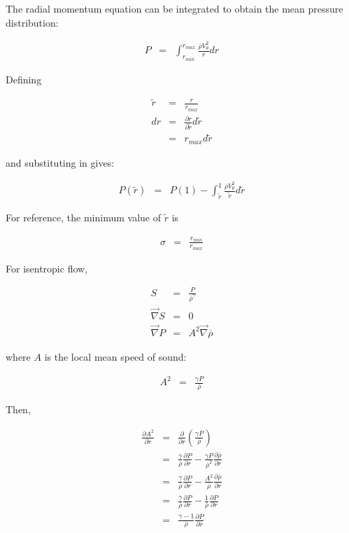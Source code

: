 \documentclass[12pt]{article}
\begin{document}
The radial momentum equation can be integrated to obtain the
mean pressure distribution:

\begin{eqnarray}
P &=& \int_{r_{min}}^{r_{max}} \frac{\overline{\rho} V_{\theta}^2}{r} dr
\nonumber
\end{eqnarray}

Defining

\begin{eqnarray}
\widetilde{r} &=& \frac{r}{r_{max}}
\nonumber
\\
dr &=& \frac{\partial r}{\partial \widetilde{r}} d \widetilde{r}
\nonumber
\\
&=& r_{max} d \widetilde{r}
\nonumber
\end{eqnarray}

and substituting in gives:

\begin{eqnarray}
P \left(\widetilde{r} \right) &=& 
P \left(1 \right)
-
\int_{\widetilde{r}}^{1} 
\frac{\overline{\rho} V_{\theta}^2}{\widetilde{r}} 
d \widetilde{r}
\nonumber
\end{eqnarray}

For reference, the minimum value of $\widetilde{r}$ is

\begin{eqnarray}
\sigma &=& \frac{r_{min}}{r_{max}}
\nonumber
\end{eqnarray}

For isentropic flow,

\begin{eqnarray}
S &=& \frac{P}{\overline{\rho}^{\gamma}}
\nonumber
\\
\vec{\nabla} S &=& 0
\nonumber
\\
\vec{\nabla} P &=& A^2 \vec{\nabla} \overline{\rho}
\nonumber
\end{eqnarray}

where $A$ is the local mean speed of sound:

\begin{eqnarray}
A^2 &=& \frac{\gamma P}{\overline{\rho}}
\nonumber
\end{eqnarray}

Then,

\begin{eqnarray}
\frac{\partial A^2}{\partial r}
&=&
\frac{\partial}{\partial r}
\left(
\frac{\gamma P}{\overline{\rho}}
\right)
\nonumber
\\
&=&
\frac{\gamma}{\overline{\rho}} \frac{\partial P}{\partial r}
-
\frac{\gamma P }{\overline{\rho}^2} \frac{\partial \overline{\rho}}{\partial r}
\nonumber
\\
&=&
\frac{\gamma}{\overline{\rho}} \frac{\partial P}{\partial r}
-
\frac{A^2}{\overline{\rho}} \frac{\partial \overline{\rho}}{\partial r}
\nonumber
\\
&=&
\frac{\gamma}{\overline{\rho}} \frac{\partial P}{\partial r}
-
\frac{1}{\overline{\rho}} \frac{\partial P}{\partial r}
\nonumber
\\
&=&
\frac{\gamma-1}{\overline{\rho}} \frac{\partial P}{\partial r}
\nonumber
\end{eqnarray}
\end{document}
